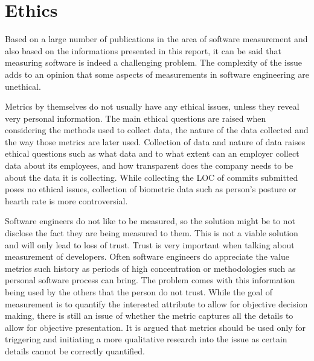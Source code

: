 \documentclass[11pt]{article}
\begin{document}


\section{Ethics}
\label{sec:Ethics}


Based on a large number of publications in the area of software measurement and also based on the informations presented in this report, it can be said that measuring software is indeed a challenging problem. The complexity of the issue adds to an opinion that some aspects of measurements in software engineering are unethical.
\par 
Metrics by themselves do not usually have any ethical issues, unless they reveal very personal information. The main ethical questions are raised when considering the methods used to collect data, the nature of the data collected and the way those metrics are later used. 
Collection of data and nature of data raises ethical questions such as what data and to what extent can an employer collect data about its employees, and how transparent does the company needs to be about the data it is collecting. While collecting the LOC of commits submitted poses no ethical issues, collection of biometric data such as person's posture or hearth rate is more controversial.
\par 
Software engineers do not like to be measured, so the solution might be to not disclose the fact they are being measured to them. This is not a viable solution and will only lead to loss of trust. Trust is very important when talking about measurement of developers. Often software engineers do appreciate the value metrics such history as periods of high concentration or methodologies such as personal software process can bring. The problem comes with this information being used by the others that the person do not trust. While the goal of measurement is to quantify the interested attribute to allow for objective decision making, there is still an issue of whether the metric captures all the details to allow for objective presentation. It is argued that metrics should be used only for triggering and initiating a more qualitative research into the issue as certain details cannot be correctly quantified.\cite{rethinking_productivity}
\end{document}
